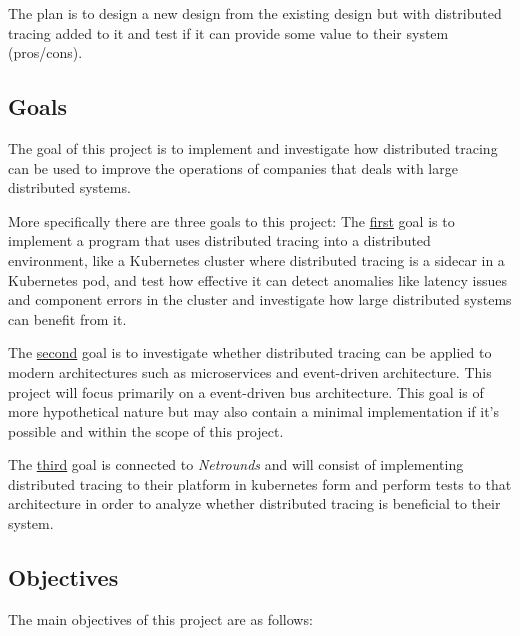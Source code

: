 \documentclass[10pt, titlepage, oneside, a4paper]{article}
\begin{document}
The plan is to design a new design from the existing design but with distributed tracing added to it and test if it can provide some value to their system (pros/cons).


\subsection{Goals}
The goal of this project is to implement and investigate how distributed tracing can be used to improve the operations of companies that deals with large distributed systems.

More specifically there are three goals to this project: The \underline{first} goal is to implement a program that uses distributed tracing into a distributed environment, like a Kubernetes cluster where distributed tracing is a sidecar in a Kubernetes pod, and test how effective it can detect anomalies like latency issues and component errors in the cluster and investigate how large distributed systems can benefit from it.

The \underline{second} goal is to investigate whether distributed tracing can be applied to modern architectures such as microservices and event-driven architecture. This project will focus primarily on a event-driven bus architecture. This goal is of more hypothetical nature but may also contain a minimal implementation if it's possible and within the scope of this project.


The \underline{third} goal is connected to \textit{Netrounds} and will consist of implementing distributed tracing to their platform in kubernetes form and perform tests to that architecture in order to analyze whether distributed tracing is beneficial to their system.





\subsection{Objectives}

The main objectives of this project are as follows:
\end{document}
